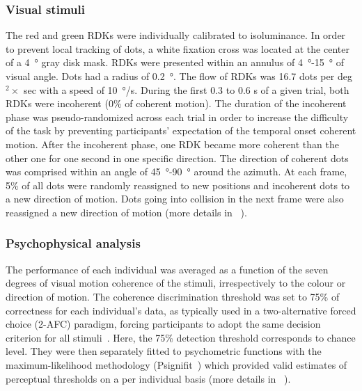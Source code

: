 \subsubsection*{Visual stimuli}
The red and green RDKs were individually calibrated to isoluminance. In order to prevent local tracking of dots, a white fixation cross was located at the center of a \SI{4}{\degree} gray disk mask. RDKs were presented within an annulus of \SI{4}{\degree}-\SI{15}{\degree} of visual angle. Dots had a radius of \SI{0.2}{\degree}. The flow of RDKs was 16.7 dots per deg$^2 \times$ sec with a speed of \SI{10}{\degree}/s. During the first 0.3 to 0.6 s of a given trial, both RDKs were incoherent (0\% of coherent motion). The duration of the incoherent phase was pseudo-randomized across each trial in order to increase the difficulty of the task by preventing participants’ expectation of the temporal onset coherent motion. After the incoherent phase, one RDK became more coherent than the other one for one second in one specific direction. The direction of coherent dots was comprised within an angle of \SI{45}{\degree}-\SI{90}{\degree} around the azimuth. At each frame, 5\% of all dots were randomly reassigned to new positions and incoherent dots to a new direction of motion. Dots going into collision in the next frame were also reassigned a new direction of motion (more details in ~\cite{23zilber2014supramodal}).


\subsubsection*{Psychophysical analysis}
The performance of each individual was averaged as a function of the seven degrees of visual motion coherence of the stimuli, irrespectively to the colour or direction of motion. The coherence discrimination threshold was set to 75\% of correctness for each individual’s data, as typically used in a two-alternative forced choice (2-AFC) paradigm, forcing participants to adopt the same decision criterion for all stimuli~\cite{GreenSwets}. Here, the 75\% detection threshold corresponds to chance level. They were then separately fitted to psychometric functions with the maximum-likelihood methodology (Psignifit~\cite{41wichmann2001psychometric}) which provided valid estimates of perceptual thresholds on a per individual basis (more details in ~\cite{23zilber2014supramodal}).

